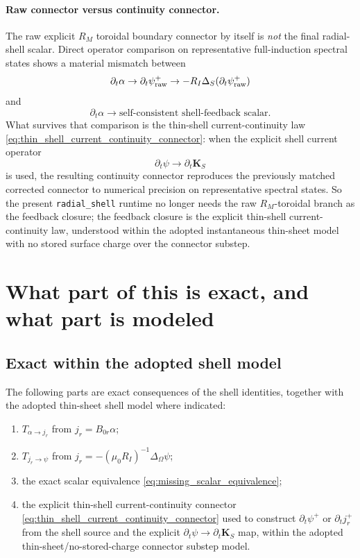\documentclass[11pt,a4paper]{article}
\begin{document}
\paragraph{Raw connector versus continuity connector.}
The raw explicit $R_M$ toroidal boundary connector by itself is \emph{not} the
final radial-shell scalar. Direct operator comparison on representative
full-induction spectral states shows a material mismatch between
\[
\partial_t\alpha \to \partial_t\psi^+_{\rm raw}
\to -R_I\Delta_S(\partial_t\psi^+_{\rm raw})
\]
and
\[
\partial_t\alpha \to \text{self-consistent shell-feedback scalar}.
\]
What survives that comparison is the thin-shell current-continuity law
\eqref{eq:thin_shell_current_continuity_connector}: when the explicit shell
current operator
\[
\partial_t\psi \to \partial_t\mathbf K_S
\]
is used, the resulting continuity connector reproduces the previously matched
corrected connector to numerical precision on representative spectral states.
So the present \texttt{radial\_shell} runtime no longer needs the raw
\(R_M\)-toroidal branch as the feedback closure; the feedback closure is the
explicit thin-shell current-continuity law, understood within the adopted
instantaneous thin-sheet model with no stored surface charge over the connector
substep.

\section{What part of this is exact, and what part is modeled}

\subsection*{Exact within the adopted shell model}

The following parts are exact consequences of the shell identities, together
with the adopted thin-sheet shell model where indicated:
\begin{enumerate}
\item $T_{\alpha\to j_r}$ from $j_r = B_{0r}\alpha$;
\item $T_{j_r\to\psi}$ from
$j_r = -(\mu_0 R_I)^{-1}\Delta_\Omega \psi$;
\item the exact scalar equivalence
\eqref{eq:missing_scalar_equivalence};
\item the explicit thin-shell current-continuity connector
\eqref{eq:thin_shell_current_continuity_connector} used to construct
$\partial_t\psi^+$ or $\partial_t j_r^+$ from the shell source and the
explicit \(\partial_t\psi\to\partial_t\mathbf K_S\) map, within the adopted
thin-sheet/no-stored-charge connector substep model.
\end{enumerate}
\end{document}
